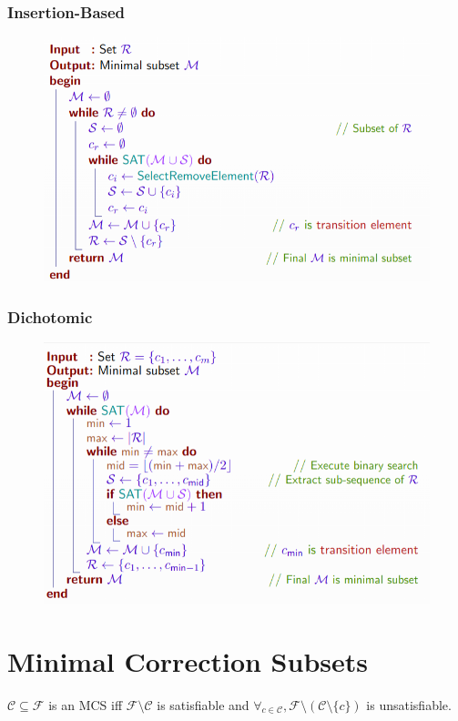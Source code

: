 \documentclass[10pt,a4paper]{report}
\begin{document}
\subsubsection{Insertion-Based}
\begin{figure}[H]
    \centering
    \includegraphics[scale=0.5]{13.png}
\end{figure}
\subsubsection{Dichotomic}
\begin{figure}[H]
    \centering
    \includegraphics[scale=0.5]{14.png}
\end{figure}

\section{Minimal Correction Subsets}
$\mathcal{C} \subseteq \mathcal{F}$ is an MCS iff $\mathcal{F} \setminus \mathcal{C}$ is satisfiable and $\forall_{c \in \mathcal{C}}, \mathcal{F} \setminus (\mathcal{C} \setminus \{c\})$ is unsatisfiable.
\end{document}
